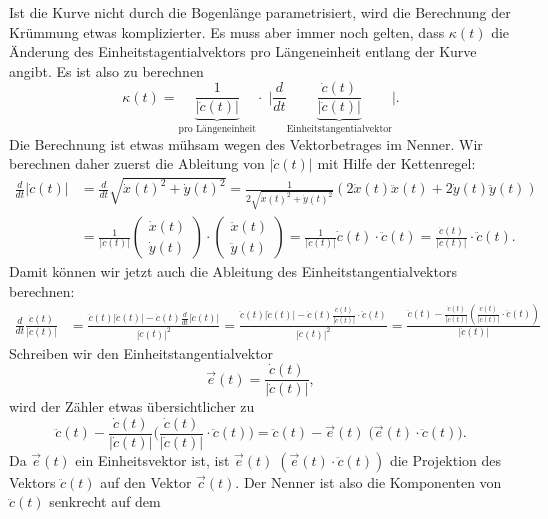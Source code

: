 Ist die Kurve nicht durch die Bogenlänge parametrisiert, wird die
Berechnung der Krümmung etwas komplizierter.
Es muss aber immer noch gelten, dass $\kappa(t)$ die Änderung des
Einheitstagentialvektors pro Längeneinheit entlang der Kurve angibt.
Es ist also zu berechnen
\begin{equation}
\kappa(t)
=
\underbrace{\frac{1}{|\dot c(t)|}}_{\text{pro Längeneinheit}}
\cdot\;
\biggl|\frac{d}{dt}\underbrace{\frac{\dot c(t)}{|\dot c(t)|}}_{\text{Einheitstangentialvektor}}\biggr|.
\label{skript:kruemmung:krallg2}
\end{equation}
Die Berechnung ist etwas mühsam wegen des Vektorbetrages im Nenner.
Wir berechnen daher zuerst die Ableitung von $|\dot c(t)|$ mit
Hilfe der Kettenregel:
\begin{align*}
\frac{d}{dt}|\dot c(t)|
&=
\frac{d}{dt}\sqrt{\dot x(t)^2+\dot y(t)^2}
=
\frac1{2\sqrt{\dot x(t)^2 + \dot y(t)^2}}(2\dot x(t)\ddot x(t) + 2\dot y(t)\ddot y(t))
\\
&=
\frac{1}{|\dot c(t)|}
\begin{pmatrix}\dot x(t)\\\dot y(t)\end{pmatrix}
\cdot
\begin{pmatrix}\ddot x(t)\\\ddot y(t)\end{pmatrix}
=
\frac{1}{|\dot c(t)|}
\dot c(t)\cdot\ddot c(t)
=
\frac{\dot c(t)}{|\dot c(t)|} \cdot\ddot c(t).
\end{align*}
Damit können wir jetzt auch die Ableitung des Einheitstangentialvektors
berechnen:
\begin{align}
\frac{d}{dt} \frac{\dot c(t)}{|\dot c(t)|}
&=
\frac{\ddot c(t) |\dot c(t)| - \dot c(t) \frac{d}{dt}|\dot c(t)|}{|\dot c(t)|^2}
=
\frac{\ddot c(t) |\dot c(t)| - \dot c(t) \frac{\dot c(t)}{|\dot c(t)|}\cdot \ddot c(t)}{|\dot c(t)|^2}
=
\frac{\ddot c(t) - \frac{\dot c(t)}{|\dot c(t)|} \left( \frac{\dot c(t)}{|\dot c(t)|}\cdot \ddot c(t)\right)}{|\dot c(t)|}
\label{skript:kruemmung:krallg1}
\end{align}
Schreiben wir den Einheitstangentialvektor
\[
\vec e(t)= \frac{\dot c(t)}{|\dot c(t)|},
\]
wird der Zähler etwas übersichtlicher zu
\[
\ddot c(t) - \frac{\dot c(t)}{|\dot c(t)|} \biggl( \frac{\dot c(t)}{|\dot c(t)|}\cdot \ddot c(t)\biggr)
=
\ddot c(t) - \vec e(t)\; \bigl(\vec{e}(t)\cdot \ddot c(t)\bigr).
\]
Da $\vec e(t)$ ein Einheitsvektor ist, ist
$\vec e(t) \;(\vec e(t)\cdot\ddot c(t))$ die Projektion des Vektors
$\ddot c(t)$ auf den Vektor $\vec c(t)$.
Der Nenner ist also die Komponenten von $\ddot c(t)$ senkrecht auf dem
